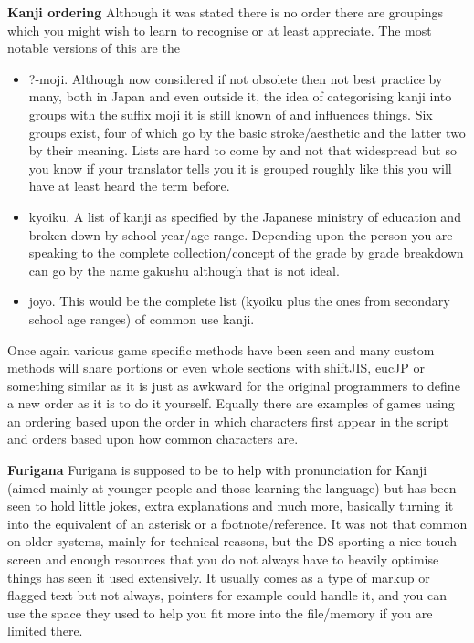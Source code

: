 \documentclass[
]{book}
\providecommand{\tightlist}{%
  \setlength{\itemsep}{0pt}\setlength{\parskip}{0pt}}
\begin{document}
\textbf{Kanji ordering} Although it was stated there is no order there are groupings which you might wish to learn to recognise or at least appreciate. The most notable versions of this are the

\begin{itemize}
\tightlist
\item
  ?-moji. Although now considered if not obsolete then not best practice by many, both in Japan and even outside it, the idea of categorising kanji into groups with the suffix moji it is still known of and influences things. Six groups exist, four of which go by the basic stroke/aesthetic and the latter two by their meaning. Lists are hard to come by and not that widespread but so you know if your translator tells you it is grouped roughly like this you will have at least heard the term before.
\item
  kyoiku. A list of kanji as specified by the Japanese ministry of education and broken down by school year/age range. Depending upon the person you are speaking to the complete collection/concept of the grade by grade breakdown can go by the name gakushu although that is not ideal.
\item
  joyo. This would be the complete list (kyoiku plus the ones from secondary school age ranges) of common use kanji.
\end{itemize}

Once again various game specific methods have been seen and many custom methods will share portions or even whole sections with shiftJIS, eucJP or something similar as it is just as awkward for the original programmers to define a new order as it is to do it yourself. Equally there are examples of games using an ordering based upon the order in which characters first appear in the script and orders based upon how common characters are.

\textbf{Furigana} Furigana is supposed to be to help with pronunciation for Kanji (aimed mainly at younger people and those learning the language) but has been seen to hold little jokes, extra explanations and much more, basically turning it into the equivalent of an asterisk or a footnote/reference. It was not that common on older systems, mainly for technical reasons, but the DS sporting a nice touch screen and enough resources that you do not always have to heavily optimise things has seen it used extensively. It usually comes as a type of markup or flagged text but not always, pointers for example could handle it, and you can use the space they used to help you fit more into the file/memory if you are limited there.
\end{document}
